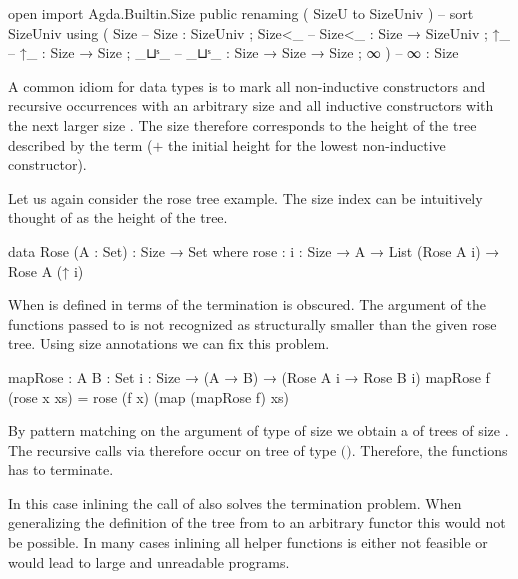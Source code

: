 \begin{code}[hide]
open import Agda.Builtin.Size public
  renaming ( SizeU to SizeUniv )  --  sort SizeUniv
  using    ( Size                 --  Size   : SizeUniv
           ; Size<_               --  Size<_ : Size → SizeUniv
           ; ↑_                   --  ↑_     : Size → Size
           ; _⊔ˢ_                 --  _⊔ˢ_   : Size → Size → Size
           ; ∞ )                  --  ∞      : Size
\end{code}

A common idiom for data types is to mark all non-inductive constructors and
recursive occurrences with an arbitrary size  and all inductive
constructors with the next larger size
\AgdaSpace{}.
The size therefore corresponds to the height of the tree described by the term
($+$ the initial height for the lowest non-inductive constructor).

Let us again consider the rose tree example.
The size index can be intuitively thought of as the height of the tree.

\begin{code}
data Rose (A : Set) : Size → Set where 
  rose : {i : Size} → A → List (Rose A i) → Rose A (↑ i)
\end{code}
When  is defined in terms of
 the termination is obscured.
The argument of the functions passed to  is not recognized as
structurally smaller than the given rose tree.
Using size annotations we can fix this problem.

\begin{code}
mapRose : {A B : Set} {i : Size} → (A → B) → (Rose A i → Rose B i)
mapRose f (rose x xs) = rose (f x) (map (mapRose f) xs)
\end{code}
By pattern matching on the argument of type
\AgdaSpace{} of size
\AgdaSpace{} we obtain a  of
trees of size .
The recursive calls via  therefore occur on tree of type 
\AgdaSpace{}\AgdaSpace{}$($\AgdaSpace{}$)$.
Therefore, the functions has to terminate.

In this case inlining the call of  also solves the termination
problem.
When generalizing the definition of the tree from  to an
arbitrary functor this would not be possible.
In many cases inlining all helper functions is either not feasible or would lead
to large and unreadable programs.


